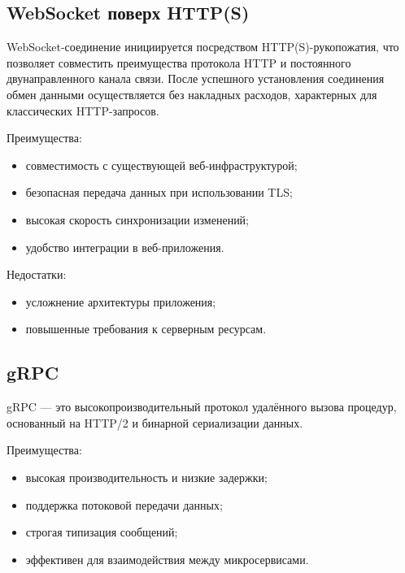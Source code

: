\subsection*{WebSocket поверх HTTP(S)}

WebSocket-соединение инициируется посредством HTTP(S)-рукопожатия, что позволяет совместить преимущества протокола HTTP и постоянного двунаправленного канала связи. После успешного установления соединения обмен данными осуществляется без накладных расходов, характерных для классических HTTP-запросов.



Преимущества:

\begin{itemize}
    \item совместимость с существующей веб-инфраструктурой;
    \item безопасная передача данных при использовании TLS;
    \item высокая скорость синхронизации изменений;
    \item удобство интеграции в веб-приложения.
\end{itemize}

Недостатки:

\begin{itemize}
    \item усложнение архитектуры приложения;
    \item повышенные требования к серверным ресурсам.
\end{itemize}

\subsection*{gRPC}

gRPC — это высокопроизводительный протокол удалённого вызова процедур, основанный на HTTP/2 и бинарной сериализации данных.

Преимущества:

\begin{itemize}
    \item высокая производительность и низкие задержки;
    \item поддержка потоковой передачи данных;
    \item строгая типизация сообщений;
    \item эффективен для взаимодействия между микросервисами.
\end{itemize}

